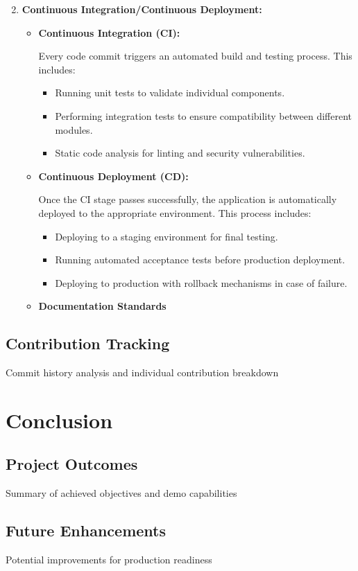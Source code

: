 \documentclass{llncs}
\begin{document}
\begin{enumerate}
    \setcounter{enumi}{1}
    \item \textbf{Continuous Integration/Continuous Deployment:}  
    \begin{itemize}
        \item \textbf{Continuous Integration (CI):}  
        
        Every code commit triggers an automated build and testing process. This includes:
        \begin{itemize}
            \item Running unit tests to validate individual components.
            \item Performing integration tests to ensure compatibility between different modules.
            \item Static code analysis for linting and security vulnerabilities.
        \end{itemize}

        \bigskip %
        \item \textbf{Continuous Deployment (CD):}  
        
        Once the CI stage passes successfully, the application is automatically deployed to the appropriate environment. This process includes:
        \begin{itemize}
            \item Deploying to a staging environment for final testing.
            \item Running automated acceptance tests before production deployment.
            \item Deploying to production with rollback mechanisms in case of failure.
        \end{itemize}

        \bigskip %

        \item \textbf{Documentation Standards}
    \end{itemize}
\end{enumerate}


\subsection{Contribution Tracking}
Commit history analysis and individual contribution breakdown

\section{Conclusion}
\subsection{Project Outcomes}
Summary of achieved objectives and demo capabilities

\subsection{Future Enhancements}
Potential improvements for production readiness

\begin{thebibliography}{9}

\end{thebibliography}
\end{document}
